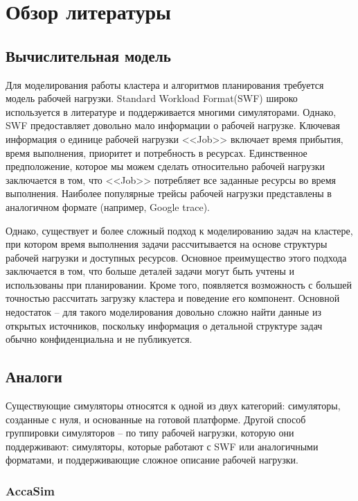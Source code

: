 \section{Обзор литературы}\label{sec:lit-review}

\subsection{Вычислительная модель}

Для моделирования работы кластера и алгоритмов планирования требуется модель рабочей нагрузки. Standard Workload Format(SWF)\cite{standard-workload-format} широко используется в литературе и поддерживается многими симуляторами. Однако, SWF предоставляет довольно мало информации о рабочей нагрузке. Ключевая информация о единице рабочей нагрузки <<Job>> включает время прибытия, время выполнения, приоритет и потребность в ресурсах. Единственное предположение, которое мы можем сделать относительно рабочей нагрузки заключается в том, что <<Job>> потребляет все заданные ресурсы во время выполнения. Наиболее популярные трейсы рабочей нагрузки представлены в аналогичном формате (например, Google trace\cite{google-clusterdata}).

Однако, существует и более сложный подход к моделированию задач на кластере, при котором время выполнения задачи рассчитывается на основе структуры рабочей нагрузки и доступных ресурсов. Основное преимущество этого подхода заключается в том, что больше деталей задачи могут быть учтены и использованы при планировании. Кроме того, появляется возможность с большей точностью рассчитать загрузку кластера и поведение его компонент. Основной недостаток -- для такого моделирования довольно сложно найти данные из открытых источников, поскольку информация о детальной структуре задач обычно конфиденциальна и не публикуется.

\subsection{Аналоги}

Существующие симуляторы относятся к одной из двух категорий: симуляторы, созданные с нуля, и основанные на готовой платформе. Другой способ группировки симуляторов -- по типу рабочей нагрузки, которую они поддерживают: симуляторы, которые работают с SWF или аналогичными форматами, и поддерживающие сложное описание рабочей нагрузки.

\subsubsection{AccaSim}

